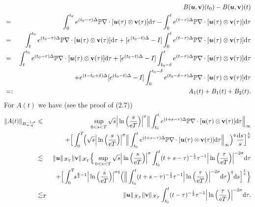 \documentclass[11pt]{article}
\newcommand{\rmd}{\mbox{\rm d}}
\newcommand{\bfu}{{\mbox{\boldmath $u$}}}
\newcommand{\rme}{{\rm e}}
\begin{document}
\begin{eqnarray}
  &&B(\bfu,\mathbf{v})(t_0)-B(\bfu,\mathbf{v})(t)
\nonumber\\
  &=&\int_0^{t_0}e^{(t_0-\tau)\Delta}\mathbb{P}\nabla\cdot[\bfu(\tau)\otimes\mathbf{v}(\tau)]\rmd\tau
  -\int_0^t e^{(t-\tau)\Delta}\mathbb{P}\nabla\cdot[\bfu(\tau)\otimes\mathbf{v}(\tau)]\rmd\tau
\nonumber\\
  &=&\int_t^{t_0} e^{(t_0-\tau)\Delta}\mathbb{P}\nabla\cdot[\bfu(\tau)\otimes\mathbf{v}(\tau)]\rmd\tau
  +[e^{(t_0-t)\Delta}-I]\int_0^t e^{(t-\tau)\Delta}\mathbb{P}\nabla\cdot[\bfu(\tau)\otimes\mathbf{v}(\tau)]\rmd\tau
\nonumber\\
  &=&\int_t^{t_0} e^{(t_0-\tau)\Delta}\mathbb{P}\nabla\cdot[\bfu(\tau)\otimes\mathbf{v}(\tau)]\rmd\tau
  +[e^{(t_0-t)\Delta}-I]\int_{t_0-\delta}^t e^{(t-\tau)\Delta}\mathbb{P}\nabla\cdot[\bfu(\tau)\otimes\mathbf{v}(\tau)]\rmd\tau
\nonumber\\
  &&+e^{(t-t_0+\delta)\Delta}[e^{(t_0-t)\Delta}-I]\int_0^{t_0-\delta}e^{(t_0-\delta-\tau)\Delta}\mathbb{P}\nabla\cdot
  [\bfu(\tau)\otimes\mathbf{v}(\tau)]\rmd\tau
\nonumber\\
  &=:& A_1(t)+B_1(t)+B_2(t).
\end{eqnarray}
  For $A(t)$ we have (see the proof of (2.7))
\begin{eqnarray*}
  \|A(t)\|_{B^{-1,\sigma}_{\infty\, q}}&\leqslant&\sup_{0<s<T}\sqrt{s}\Big|\ln\Big(\frac{s}{\rme T}\Big)\Big|^{\sigma}
  \Big\|\int_{t_0}^t e^{(t+s-\tau)\Delta}\mathbb{P}\nabla\cdot[\bfu(\tau)\otimes\mathbf{v}(\tau)]\rmd\tau\Big\|_{\infty}
\\
  &&+\Big[\int_0^T\!\!\Big(\sqrt{s}\Big|\ln\Big(\frac{s}{\rme T}\Big)\Big|^{\sigma}
  \Big\|\int_{t_0}^t e^{(t+s-\tau)\Delta}\mathbb{P}\nabla\cdot[\bfu(\tau)\otimes\mathbf{v}(\tau)]\rmd\tau\Big\|_{\infty}
  \Big)^q\frac{\rmd s}{s}\Big]^{\frac{1}{q}}
\\
  &\lesssim &
  \|\bfu\|_{\mathscr{X}_T}\|\mathbf{v}\|_{\mathscr{X}_T}\Big\{\sup_{0<s<T}\sqrt{s}\Big|\ln\Big(\frac{s}{\rme T}\Big)\Big|^{\sigma}
  \int_{t_0}^t(t+s-\tau)^{-\frac{1}{2}}\tau^{-1}\Big|\ln\Big(\frac{\tau}{\rme T}\Big)\Big|^{-2\sigma}\rmd\tau
\\
  &&+\Big[\int_0^T\!\!s^{\frac{q}{2}-1}\Big|\ln\Big(\frac{s}{\rme T}\Big)\Big|^{\sigma q}\Big(
  \Big\|\int_{t_0}^t(t+s-\tau)^{-\frac{1}{2}}\tau^{-1}\Big|\ln\Big(\frac{\tau}{\rme T}\Big)\Big|^{-2\sigma}\rmd\tau
  \Big)^q\rmd s\Big]^{\frac{1}{q}}\Big\}
\\
  &\lesssim_T&
  \|\bfu\|_{\mathscr{X}_T}\|\mathbf{v}\|_{\mathscr{X}_T}\int_{t_0}^t(t-\tau)^{-\frac{1}{2}}\tau^{-1}
  \Big|\ln\Big(\frac{\tau}{\rme T}\Big)\Big|^{-2\sigma}\rmd\tau.
\end{eqnarray*}
\end{document}
